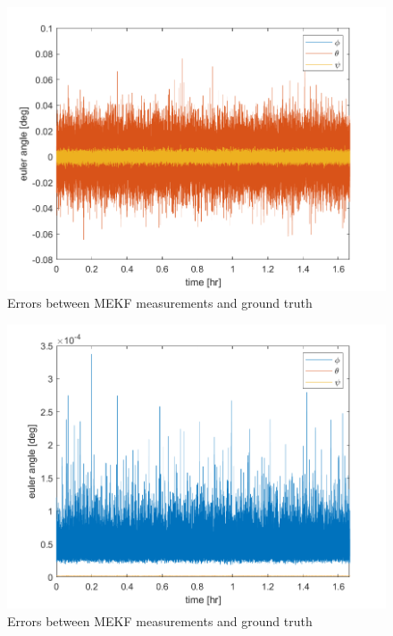 \begin{figure}[H]
\centering
\includegraphics[scale=0.6]{Images/ps8_problem7_error.png}
\caption{Errors between MEKF measurements and ground truth}
\label{fig:ps8_problem7_error}
\end{figure}

\begin{figure}[H]
\centering
\includegraphics[scale=0.6]{Images/ps8_problem7_cov.png}
\caption{Errors between MEKF measurements and ground truth}
\label{fig:ps8_problem7_error}
\end{figure}

